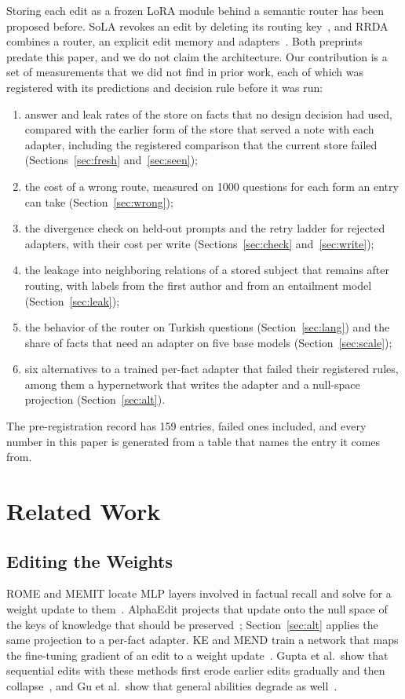 \documentclass[journal,10pt]{IEEEtran}
\begin{document}
Storing each edit as a frozen LoRA module behind a semantic router has been proposed before. SoLA
revokes an edit by deleting its routing key~\cite{luo2026sola}, and RRDA combines a router, an explicit
edit memory and adapters~\cite{zhang2026rrda}. Both preprints predate this paper, and we do not claim the
architecture. Our contribution is a set of measurements that we did not find in prior work, each of which
was registered with its predictions and decision rule before it was run:
\begin{enumerate}
\item answer and leak rates of the store on facts that no design decision had used, compared with the
earlier form of the store that served a note with each adapter, including the registered comparison
that the current store failed (Sections~\ref{sec:fresh} and~\ref{sec:seen});
\item the cost of a wrong route, measured on 1000 questions for each form an entry can take
(Section~\ref{sec:wrong});
\item the divergence check on held-out prompts and the retry ladder for rejected adapters, with their cost
per write (Sections~\ref{sec:check} and~\ref{sec:write});
\item the leakage into neighboring relations of a stored subject that remains after routing, with labels
from the first author and from an entailment model (Section~\ref{sec:leak});
\item the behavior of the router on Turkish questions (Section~\ref{sec:lang}) and the share of facts
that need an adapter on five base models (Section~\ref{sec:scale});
\item six alternatives to a trained per-fact adapter that failed their registered rules, among them a
hypernetwork that writes the adapter and a null-space projection (Section~\ref{sec:alt}).
\end{enumerate}
The pre-registration record has 159 entries, failed ones included, and every number in this paper is
generated from a table that names the entry it comes from.

\section{Related Work}
\label{sec:related}

\subsection{Editing the Weights}
ROME and MEMIT locate MLP layers involved in factual recall and solve for a weight update to
them~\cite{meng2022rome,meng2023memit}. AlphaEdit projects that update onto the null space of the keys of
knowledge that should be preserved~\cite{fang2025alphaedit}; Section~\ref{sec:alt} applies the same
projection to a per-fact adapter. KE and MEND train a network that maps the fine-tuning gradient of an
edit to a weight update~\cite{decao2021editing,mitchell2022mend}. Gupta et al.\ show that sequential edits
with these methods first erode earlier edits gradually and then collapse~\cite{gupta2024forgetting}, and
Gu et al.\ show that general abilities degrade as well~\cite{gu2024harms}.
\end{document}
